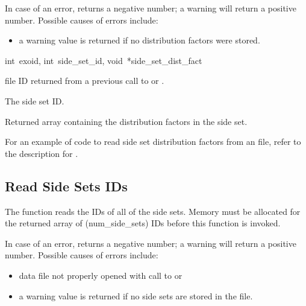 In case of an error,  returns a
negative number; a warning will return a positive number. Possible
causes of errors include:

\begin{itemize}
 \item a warning value is returned if no distribution factors
were stored.
\end{itemize}

{int~exoid,
int~side_set_id,
void~*side_set_dist_fact}

\begin{parameters}
\item[{int exoid \R{}}]
\exo{} file ID returned from a previous call to 
or .

\item[{int side_set_id \R{}}]
The side set ID.

\item[{void* side_set_dist_fact \W{}}]
Returned array containing the distribution factors in the
side set.
\end{parameters}

For an example of code to read side set distribution factors from an
\exo{} file, refer to the description for
.




\subsection{Read Side Sets IDs }

The function  reads the IDs of all of
the side sets. Memory must be allocated for the returned array of
({num_side_sets}) IDs before this function is invoked.

In case of an error,  returns a
negative number; a warning will return a positive number. Possible
causes of errors include:

\begin{itemize}
 \item data file not properly opened with call to 
 or 

 \item a warning value is returned if no side sets are stored
in the file.
\end{itemize}



